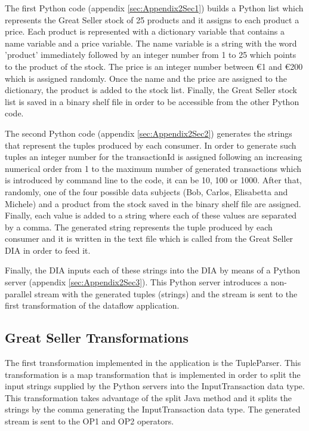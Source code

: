 The first Python code (appendix \ref{sec:Appendix2Sec1}) builds a Python list which represents the Great Seller stock of 25 products and it assigns to each product a price. Each product is represented with a dictionary variable that contains a name variable and a price variable. The name variable is a string with the word 'product' immediately followed by an integer number from 1 to 25 which points to the product of the stock. The price is an integer number between \euro{1} and \euro{200} which is assigned randomly. Once the name and the price are assigned to the dictionary, the product is added to the stock list. Finally, the Great Seller stock list is saved in a binary shelf file in order to be accessible from the other Python code.

The second Python code (appendix \ref{sec:Appendix2Sec2}) generates the strings that represent the tuples produced by each consumer. In order to generate such tuples an integer number for the transactionId is assigned following an increasing numerical order from 1 to the maximum number of generated transactions which is introduced by command line to the code, it can be 10, 100 or 1000. After that, randomly, one of the four possible data subjects (Bob, Carlos, Elisabetta and Michele) and a product from the stock saved in the binary shelf file are assigned. Finally, each value is added to a string where each of these values are separated by a comma. The generated string represents the tuple produced by each consumer and it is written in the text file which is called from the Great Seller DIA in order to feed it.

Finally, the DIA inputs each of these strings into the DIA by means of a Python server (appendix \ref{sec:Appendix2Sec3}). This Python server introduces a non-parallel stream with the generated tuples (strings) and the stream is sent to the first transformation of the dataflow application.

\subsection{Great Seller Transformations}

The first transformation implemented in the application is the TupleParser. This transformation is a map transformation that is implemented in order to split the input strings supplied by the Python servers into the InputTransaction data type. This transformation takes advantage of the split Java method and it splits the strings by the comma generating the InputTransaction data type. The generated stream is sent to the OP1 and OP2 operators.

